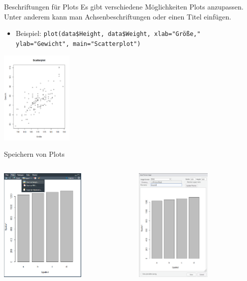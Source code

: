 \documentclass[xcolor=dvipsnames, aspectratio = 169]{beamer}
\begin{document}
\begin{frame}[fragile]{Beschriftungen für Plots}
	Es gibt verschiedene Möglichkeiten Plots anzupassen. Unter anderem kann man Achsenbeschriftungen oder einen Titel einfügen.
	\begin{itemize}
		\item Beispiel: \verb+plot(data$Height, data$Weight, xlab="Größe,"+
		\verb+            ylab="Gewicht", main="Scatterplot")+
	\end{itemize}
			
	\begin{center}
		\includegraphics[height=4.5cm]{AnnotatedPlot}
	\end{center}
\end{frame}

\begin{frame}[fragile]{Speichern von Plots}
	\begin{columns}[T]
		\begin{column}{0.5\textwidth}
			\begin{center}
				\includegraphics[height=5.5cm]{SaveImage}
			\end{center}
		\end{column}
		\begin{column}{0.5\textwidth}
			\begin{center}
				\includegraphics[height=5.5cm]{SaveImage2}
			\end{center}
		\end{column}
	\end{columns}	
\end{frame}
\end{document}
